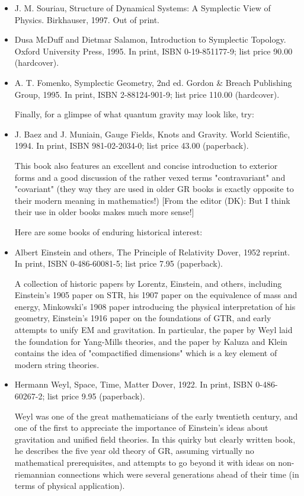 \documentclass[10pt,a4paper]{book}
\theoremstyle{definition}
\begin{document}
\begin{itemize}
\item J. M. Souriau,
Structure of Dynamical Systems: A Symplectic View of Physics.
Birkhauser, 1997.
Out of print.

\item Dusa McDuff and Dietmar Salamon,
Introduction to Symplectic Topology.
Oxford University Press, 1995.
In print, ISBN 0-19-851177-9; list price 90.00 (hardcover).

\item A. T. Fomenko,
Symplectic Geometry, 2nd ed.
Gordon \& Breach Publishing Group, 1995.
In print, ISBN 2-88124-901-9; list price 110.00 (hardcover).

Finally, for a glimpse of what quantum gravity may look like, try:

\item J. Baez and J. Muniain,
Gauge Fields, Knots and Gravity.
World Scientific, 1994.
In print, ISBN 981-02-2034-0; list price 43.00 (paperback).

This book also features an excellent and concise introduction to exterior forms and a good discussion of the rather vexed terms "contravariant" and "covariant" (they way they are used in older GR books is exactly opposite to their modern meaning in mathematics!) [From the editor (DK): But I think their use in older books makes much more sense!]

Here are some books of enduring historical interest:

\item Albert Einstein and others,
The Principle of Relativity
Dover, 1952 reprint.
In print, ISBN 0-486-60081-5; list price 7.95 (paperback).

A collection of historic papers by Lorentz, Einstein, and others, including Einstein's 1905 paper on STR, his 1907 paper on the equivalence of mass and energy, Minkowski's 1908 paper introducing the physical interpretation of his geometry, Einstein's 1916 paper on the foundations of GTR, and early attempts to unify EM and gravitation.  In particular, the paper by Weyl laid the foundation for Yang-Mills theories, and the paper by Kaluza and Klein contains the idea of "compactified dimensions" which is a key element of modern string theories.

\item Hermann Weyl,
Space, Time, Matter
Dover, 1922.
In print, ISBN 0-486-60267-2; list price 9.95 (paperback).

Weyl was one of the great mathematicians of the early twentieth century, and one of the first to appreciate the importance of Einstein's ideas about gravitation and unified field theories.  In this quirky but clearly written book, he describes the five year old theory of GR, assuming virtually no mathematical prerequisites, and attempts to go beyond it with ideas on non-riemannian connections which were several generations ahead of their time (in terms of physical application).


\end{itemize}
\end{document}
